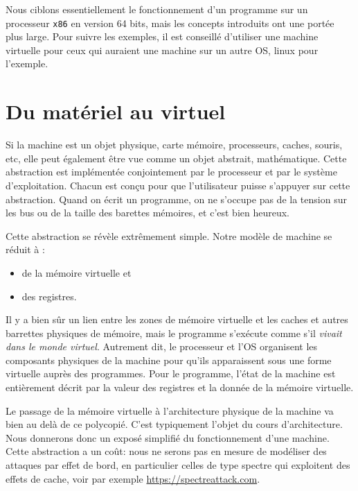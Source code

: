\documentclass{book}
\newcommand{\xquatre}{{\tt x86}\xspace}
\begin{document}
Nous ciblons essentiellement le fonctionnement d'un programme sur un processeur \xquatre en version 64 bits, mais les concepts introduits ont une portée plus large. Pour suivre les exemples, il est conseillé d'utiliser une machine virtuelle pour ceux qui auraient une machine sur un autre OS, {\sc linux} pour l'exemple. 


\section{Du matériel au virtuel}

Si la machine est un objet physique, carte mémoire, processeurs, caches, souris, etc, elle peut également être vue comme un objet abstrait, mathématique. Cette abstraction est implémentée conjointement par le processeur et par le système d'exploi\-tation. Chacun est conçu pour que l'utilisateur puisse s'appuyer sur cette abstraction. Quand on écrit un programme, on ne s'occupe pas de la tension sur les bus ou de la taille des barettes mémoires, et c'est bien heureux.

Cette abstraction se révèle extrêmement simple. Notre modèle de machine se réduit à :
\begin{itemize}
	\item de la mémoire virtuelle et
	\item  des registres. 
\end{itemize}

Il y a bien sûr un lien entre les zones de mémoire virtuelle et les caches et autres barrettes physiques de mémoire, mais le programme s'exécute comme s'il \emph{vivait dans le monde virtuel}. Autrement dit, le processeur et l'OS organisent les composants physiques de la machine pour qu'ils apparaissent sous une forme virtuelle auprès des programmes. Pour le programme, l'état de la machine est entièrement décrit par la valeur des registres et la donnée de la mémoire virtuelle. 

Le passage de la mémoire virtuelle à l'architecture physique de la machine va bien au delà de ce polycopié. C'est typiquement l'objet du cours d'architecture. Nous donnerons donc un exposé simplifié du fonctionnement d'une machine. Cette abstraction a un coût: nous ne serons pas en mesure de modéliser des attaques par effet de bord, en particulier celles de type {\sc spectre} qui exploitent des effets de cache, voir par exemple \url{https://spectreattack.com}. %
\end{document}
